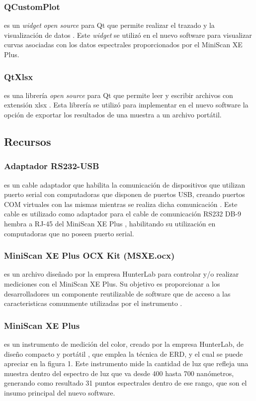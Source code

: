 \documentclass[conference]{IEEEtran}
\begin{document}
		\subsubsection{QCustomPlot}
			es un \textit{widget} \textit{open source} para Qt que permite realizar el trazado y la visualizaci\'{o}n de datos \cite{QCustomPlot}. Este \textit{widget} se utiliz\'{o} en el nuevo software para visualizar curvas asociadas con los datos espectrales proporcionados por el MiniScan XE Plus.
			
		\subsubsection{QtXlsx}
		
			es una librer\'{i}a \textit{open source} para Qt que permite leer y escribir archivos con extensi\'{o}n xlsx \cite{Qtxlsx}. Esta librer\'{i}a se utiliz\'{o} para implementar en el nuevo software la opci\'{o}n de exportar los resultados de una muestra a un archivo port\'{a}til.
			
	\subsection{Recursos}
		
		\subsubsection{Adaptador RS232-USB}
			es un cable adaptador que habilita la comunicaci\'{o}n de dispositivos que utilizan puerto serial con computadoras que disponen de puertos USB, creando puertos COM virtuales con las mismas mientras se realiza dicha comunicaci\'{o}n \cite{RS232}. Este cable es utilizado como adaptador para el cable de comunicaci\'{o}n RS232 DB-9 hembra a \mbox{RJ-45} del MiniScan XE Plus \cite{HunterLab-manual}, habilitando su utilizaci\'{o}n en computadoras que no poseen puerto serial.
		
		\subsubsection{MiniScan XE Plus OCX Kit (MSXE.ocx)}
			es un archivo dise\~{n}ado por la empresa HunterLab para controlar y/o realizar mediciones con el MiniScan XE Plus. Su objetivo es proporcionar a los desarrolladores un componente reutilizable de software que de acceso a las caracteristicas comunmente utilizadas por el instrumento \cite{MiniScanXEPlus-manual}.
			
		\subsubsection{MiniScan XE Plus}
		es un instrumento de medici\'{o}n del color, creado por la empresa HunterLab, de dise\~{n}o compacto y port\'{a}til \cite{MiniScanXEPlus-manual}, que emplea la t\'{e}cnica de ERD, y el cual se puede apreciar en la figura 1. Este instrumento mide la cantidad de luz que refleja una muestra dentro del espectro de luz que va desde 400 hasta 700 nan\'{o}metros, generando como resultado 31 puntos espectrales dentro de ese rango, que son el insumo principal del nuevo software.
\end{document}

